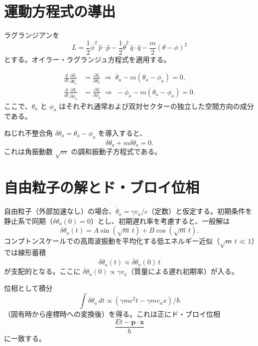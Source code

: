 \documentclass[dvipdfmx,a4paper]{article}
\begin{document}
\section{運動方程式の導出}

ラグランジアンを
\begin{equation}
L = \frac{1}{2} \dot{\phi}^2 \, \hat{p}\cdot\hat{p}
- \frac{1}{2} \dot{\theta}^2 \, \hat{q}\cdot\hat{q}
- \frac{m}{2} (\theta - \phi)^2
\end{equation}
とする。オイラー・ラグランジュ方程式を適用する。

\begin{align}
\frac{d}{dt}\frac{\partial L}{\partial \dot{\theta}_a} &= \frac{\partial L}{\partial \theta_a}
\;\Rightarrow\; \ddot{\theta}_a - m (\theta_a - \phi_a) = 0,\\[6pt]
\frac{d}{dt}\frac{\partial L}{\partial \dot{\phi}_a} &= \frac{\partial L}{\partial \phi_a}
\;\Rightarrow\; -\ddot{\phi}_a - m (\theta_a - \phi_a) = 0.
\end{align}
ここで、$\theta_a$ と $\phi_a$ はそれぞれ通常および双対セクターの独立した空間方向の成分である。

ねじれ不整合角 $\delta\theta_a = \theta_a - \phi_a$ を導入すると、
\begin{equation}
\ddot{\delta\theta}_a + m \delta\theta_a = 0.
\end{equation}
これは角振動数 $\sqrt{m}$ の調和振動子方程式である。

\section{自由粒子の解とド・ブロイ位相}

自由粒子（外部加速なし）の場合、$\dot{\theta}_a = \gamma v_a/c$（定数）と仮定する。初期条件を静止系で同期（$\delta\theta_a(0)=0$）とし、初期遅れ率を考慮すると、一般解は
\begin{equation}
\delta\theta_a(t) = A \sin(\sqrt{m}\, t) + B \cos(\sqrt{m}\, t).
\end{equation}
コンプトンスケールでの高周波振動を平均化する低エネルギー近似（$\sqrt{m}\, t \ll 1$）では線形蓄積
\[
\delta\theta_a(t) \approx \dot{\delta\theta}_a(0)\, t
\]
が支配的となる。ここに $\dot{\delta\theta}_a(0) \propto \gamma v_a$（質量による遅れ初期率）が入る。

位相として積分
\[
\int \delta\theta_a\, dt \propto (\gamma m c^2 t - \gamma m v_a x)/\hbar
\]
（固有時から座標時への変換後）を得る。これは正にド・ブロイ位相
\[
\frac{E t - \mathbf{p}\cdot\mathbf{x}}{\hbar}
\]
に一致する。
\end{document}
